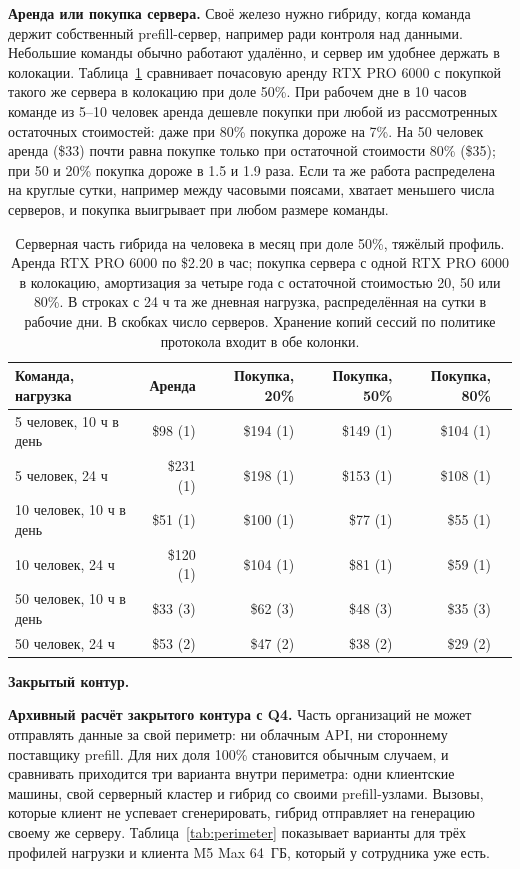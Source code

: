 \textbf{Аренда или покупка сервера.} Своё железо нужно гибриду, когда команда держит собственный prefill-сервер,
например ради контроля над данными. Небольшие команды обычно работают удалённо, и сервер им удобнее держать в
колокации. Таблица~\ref{tab:rentbuy} сравнивает почасовую аренду RTX PRO 6000 с покупкой такого же
сервера в колокацию при доле 50\%. При рабочем дне в 10 часов команде из 5--10 человек аренда дешевле покупки при любой из рассмотренных остаточных
стоимостей: даже при 80\% покупка дороже на 7\%. На 50 человек аренда (\$33) почти равна покупке только при
остаточной стоимости 80\% (\$35); при 50 и 20\% покупка дороже в 1.5 и 1.9 раза. Если та же работа распределена на
круглые сутки, например между часовыми поясами, хватает меньшего числа серверов, и покупка выигрывает при любом
размере команды.

\begin{table}[t]
\centering
\caption{Серверная часть гибрида на человека в месяц при доле 50\%, тяжёлый профиль. Аренда RTX PRO 6000 по
\$2.20 в час; покупка сервера с одной RTX PRO 6000 в колокацию, амортизация за четыре года с остаточной стоимостью
20, 50 или 80\%. В строках с 24 ч та же дневная нагрузка, распределённая на сутки в рабочие дни. В скобках число серверов.
Хранение копий сессий по политике протокола входит в обе колонки.}
\label{tab:rentbuy}
\footnotesize
\begin{tabular}{lrrrrr}
\toprule
Команда, нагрузка & Аренда & Покупка, 20\% & Покупка, 50\% & Покупка, 80\% \\
\midrule
5 человек, 10 ч в день & \$98 (1) & \$194 (1) & \$149 (1) & \$104 (1) \\
5 человек, 24 ч & \$231 (1) & \$198 (1) & \$153 (1) & \$108 (1) \\
10 человек, 10 ч в день & \$51 (1) & \$100 (1) & \$77 (1) & \$55 (1) \\
10 человек, 24 ч & \$120 (1) & \$104 (1) & \$81 (1) & \$59 (1) \\
50 человек, 10 ч в день & \$33 (3) & \$62 (3) & \$48 (3) & \$35 (3) \\
50 человек, 24 ч & \$53 (2) & \$47 (2) & \$38 (2) & \$29 (2) \\
\bottomrule
\end{tabular}
\end{table}

\textbf{Закрытый контур.}

\textbf{Архивный расчёт закрытого контура с Q4.} Часть организаций не может отправлять данные за свой периметр: ни облачным API, ни
стороннему поставщику prefill. Для них доля 100\% становится обычным случаем, и сравнивать приходится три варианта
внутри периметра: одни клиентские машины, свой серверный кластер и гибрид со своими prefill-узлами. Вызовы, которые
клиент не успевает сгенерировать, гибрид отправляет на генерацию своему же серверу. Таблица~\ref{tab:perimeter}
показывает варианты для трёх профилей нагрузки и клиента M5 Max 64~ГБ, который у сотрудника уже есть.

